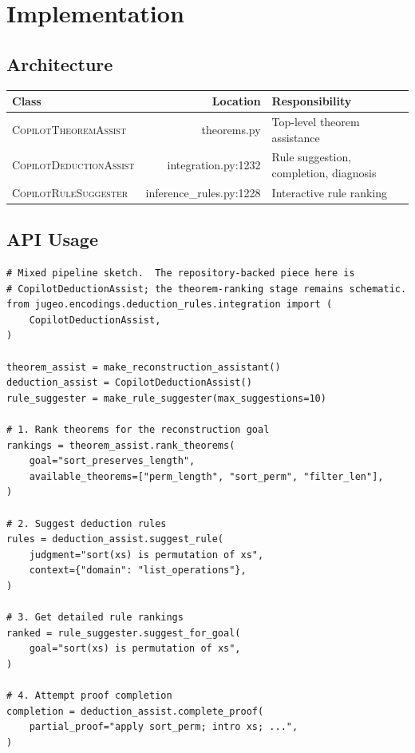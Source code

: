 \documentclass[11pt]{article}
\newcommand{\ThAssist}{\textsc{CopilotTheoremAssist}}
\newcommand{\DeducAssist}{\textsc{CopilotDeductionAssist}}
\newcommand{\RuleSugg}{\textsc{CopilotRuleSuggester}}
\begin{document}
\section{Implementation}\label{sec:impl}

\subsection{Architecture}

\begin{center}
\begin{tabular}{lrl}
\toprule
\textbf{Class} & \textbf{Location} & \textbf{Responsibility} \\
\midrule
\ThAssist     & theorems.py         & Top-level theorem assistance \\
\DeducAssist  & integration.py:1232 & Rule suggestion, completion, diagnosis \\
\RuleSugg     & inference\_rules.py:1228 & Interactive rule ranking \\
\bottomrule
\end{tabular}
\end{center}

\subsection{API Usage}

\begin{lstlisting}[style=jugeo-python]
# Mixed pipeline sketch.  The repository-backed piece here is
# CopilotDeductionAssist; the theorem-ranking stage remains schematic.
from jugeo.encodings.deduction_rules.integration import (
    CopilotDeductionAssist,
)

theorem_assist = make_reconstruction_assistant()
deduction_assist = CopilotDeductionAssist()
rule_suggester = make_rule_suggester(max_suggestions=10)

# 1. Rank theorems for the reconstruction goal
rankings = theorem_assist.rank_theorems(
    goal="sort_preserves_length",
    available_theorems=["perm_length", "sort_perm", "filter_len"],
)

# 2. Suggest deduction rules
rules = deduction_assist.suggest_rule(
    judgment="sort(xs) is permutation of xs",
    context={"domain": "list_operations"},
)

# 3. Get detailed rule rankings
ranked = rule_suggester.suggest_for_goal(
    goal="sort(xs) is permutation of xs",
)

# 4. Attempt proof completion
completion = deduction_assist.complete_proof(
    partial_proof="apply sort_perm; intro xs; ...",
)
\end{lstlisting}
\end{document}
